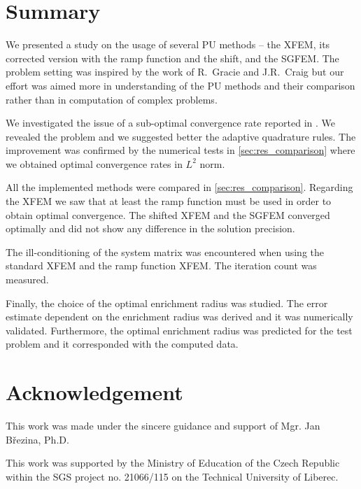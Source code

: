 \documentclass{elsarticle}
\begin{document}
\section{Summary}
\label{sec:summary}

We presented a study on the usage of several PU methods -- the XFEM, its corrected version with the ramp 
function and the shift, and the SGFEM. The problem setting was inspired by the work \cite{gracie_modelling_2010,craig_using_2011} 
of R.~Gracie and J.R.~Craig but our effort was aimed more in understanding of the PU methods and their comparison
rather than in computation of complex problems.

We investigated the issue of a sub-optimal convergence rate reported in \cite{gracie_modelling_2010}. We revealed the problem
and we suggested better the adaptive quadrature rules. The improvement was confirmed by the numerical
tests in \ref{sec:res_comparison} where we obtained optimal convergence rates in $L^2$ norm.

All the implemented methods were compared in \ref{sec:res_comparison}. Regarding the XFEM we saw that at 
least the ramp function must be used in order to obtain optimal convergence. The shifted XFEM and 
the SGFEM converged optimally and did not show any difference in the solution precision.

The ill-conditioning of the system matrix was encountered when using the standard XFEM and the ramp function XFEM.
The iteration count was measured.

Finally, the choice of the optimal enrichment radius was studied. The error estimate dependent on the enrichment
radius was derived and it was numerically validated. Furthermore, the optimal enrichment radius was predicted 
for the test problem and it corresponded with the computed data.

\section{Acknowledgement}
This work was made under the sincere guidance and support of Mgr. Jan B{\v r}ezina, Ph.D.

This work was supported by the Ministry of Education of the Czech Republic within the SGS project 
no. 21066/115 on the Technical University of Liberec.


\end{document}
